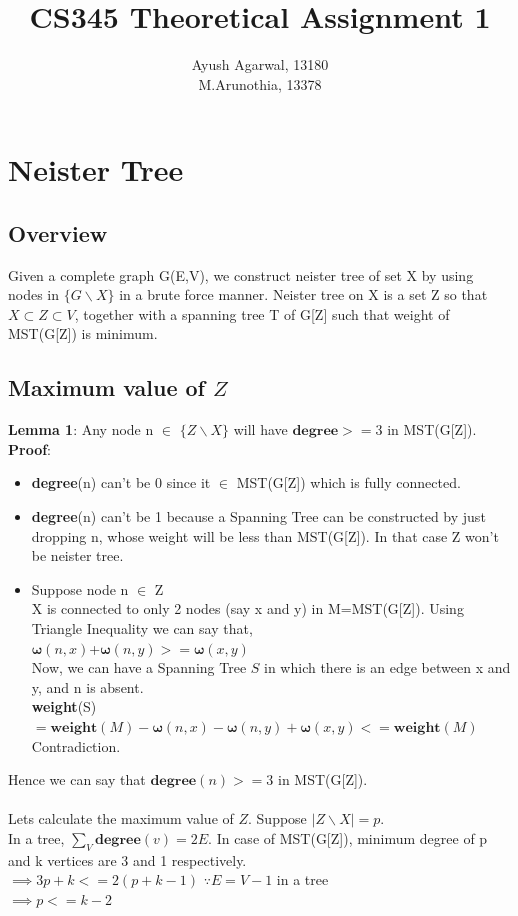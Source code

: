 \documentclass{article}
\title{CS345 Theoretical Assignment 1 \\ }
\author{\vspace{2mm} \large Ayush Agarwal, 13180 \\ M.Arunothia, 13378}
\date{}
\begin{document}
\maketitle
\tableofcontents
\newpage
\section{Neister Tree}
\subsection{Overview}
Given a complete graph G(E,V), we construct neister tree of set X by using nodes in $\{G \backslash X\}$ in a brute force manner.
Neister tree on X is a set Z so that $X \subset Z \subset V$, together with a spanning tree T of G[Z] such that weight of MST(G[Z]) is minimum.

\subsection{Maximum value of $Z$ }
\textbf{Lemma 1}: Any node n $\in$ $\{Z \backslash X\}$ will have $\textbf{degree}>=3$ in MST(G[Z]).\\
\textbf{Proof}: 
\begin{itemize} \itemsep -3pt
\item \textbf{degree}(n) can't be 0 since it $\in$ MST(G[Z]) which is fully connected.
\item \textbf{degree}(n) can't be 1 because a Spanning Tree can be constructed by just dropping n, whose weight will be less than MST(G[Z]). In that case Z won't be neister tree.
\item Suppose node n $\in$ {Z\\X} is connected to only 2 nodes (say x and y) in M=MST(G[Z]).
 Using Triangle Inequality we can say that,\\
 \hspace*{1cm}  $\boldsymbol{\omega}(n,x) $+$ \boldsymbol{\omega}(n,y) >= \boldsymbol{\omega}(x,y)$ \\ 
 Now, we can have a Spanning Tree $S$ in which there is an edge between x and y, and n is absent.\\
 \hspace*{1cm} \textbf{weight}(S)$= \textbf{weight}(M) - \boldsymbol{\omega}(n,x) - \boldsymbol{\omega}(n,y) + \boldsymbol{\omega}(x,y) <= \textbf{weight}(M)$\\
 Contradiction.  
\end{itemize}
Hence we can say that $\textbf{degree}(n)>=3$ in MST(G[Z]).\\
\\
Lets calculate the maximum value of $Z$. Suppose $\mid Z\backslash X\mid = p$.\\
In a tree, $\sum_V \textbf{degree}(v) = 2E$. In case of MST(G[Z]), minimum degree of p and k vertices are 3 and 1 respectively. \\
\hspace*{1cm} $\implies 3p + k <= 2(p+k-1)$     \hspace*{1cm}$\because E=V-1$ in a tree\\
\hspace*{1cm} $\implies p<=k-2$\\
\end{document}
